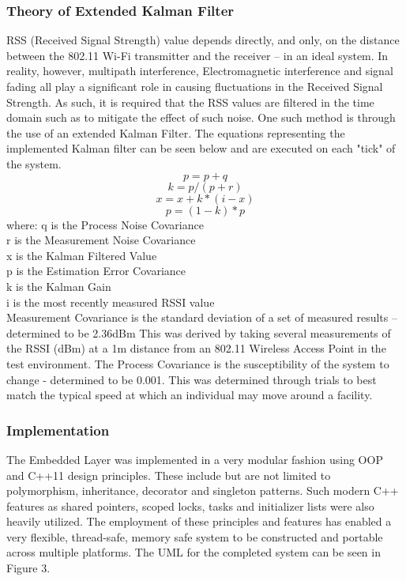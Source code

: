 \documentclass[conference]{IEEEtran}
\begin{document}
\subsubsection{Theory of Extended Kalman Filter}
RSS (Received Signal Strength) value depends directly, and only, on the distance between the 802.11 Wi-Fi transmitter and the receiver – in an ideal system. In reality, however, multipath interference, Electromagnetic interference and signal fading all play a significant role in causing fluctuations in the Received Signal Strength. As such, it is required that the RSS values are filtered in the time domain such as to mitigate the effect of such noise. One such method is through the use of an extended Kalman Filter. The equations representing the implemented Kalman filter can be seen below and are executed on each "tick" of the system.
\begin{equation}
p = p + q
\end{equation}
\begin{equation}
k = p / (p + r)
\end{equation}
\begin{equation}
x = x + k * (i - x)
\end{equation}
\begin{equation}
p = (1 - k) * p
\end{equation}
where:
\newline
q is the Process Noise Covariance \\
r  is the Measurement Noise Covariance \\
x is the Kalman Filtered Value \\
p is the Estimation Error Covariance \\
k is the Kalman Gain \\
i is the most recently measured RSSI value\\

\noindent Measurement Covariance is the standard deviation of a set of measured results – determined to be 2.36dBm This was derived by taking several measurements of the RSSI (dBm) at a 1m distance from an 802.11 Wireless Access Point in the test environment. The Process Covariance is the susceptibility of the system to change - determined to be 0.001. This was determined through trials to best match the typical speed at which an individual may move around a facility.
\newline
\subsubsection{Implementation}
The Embedded Layer was implemented in a very modular fashion using OOP and C++11 design principles. These include but are not limited to polymorphism, inheritance, decorator and singleton patterns. Such modern C++ features as shared pointers, scoped locks, tasks and initializer lists were also heavily utilized.
The employment of these principles and features has enabled a very flexible, thread-safe, memory safe system to be constructed and portable across multiple platforms. The UML for the completed system can be seen in Figure 3.
\end{document}
